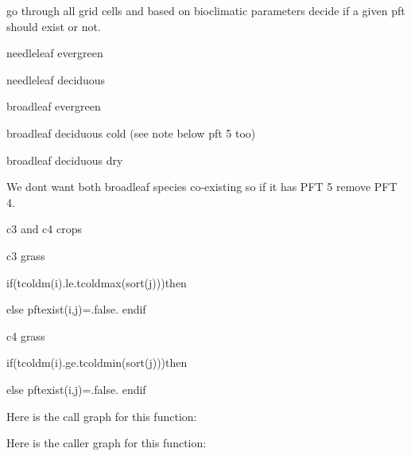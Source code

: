 go through all grid cells and based on bioclimatic parameters decide if a given pft should exist or not.

needleleaf evergreen

needleleaf deciduous

broadleaf evergreen

broadleaf deciduous cold (see note below pft 5 too)

broadleaf deciduous dry

We don\textquotesingle{}t want both broadleaf species co-\/existing so if it has P\+F\+T 5 remove P\+F\+T 4.

c3 and c4 crops

c3 grass

if(tcoldm(i).le.\+tcoldmax(sort(j)))then

else pftexist(i,j)=.false. endif

c4 grass

if(tcoldm(i).ge.\+tcoldmin(sort(j)))then

else pftexist(i,j)=.false. endif 

Here is the call graph for this function\+:




Here is the caller graph for this function\+:


